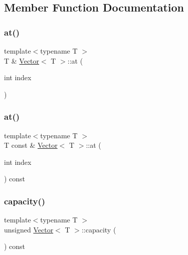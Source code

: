 \subsection{Member Function Documentation}
\mbox{\label{classVector_a0a53d8de64ae7cc1e388df4e46ab06bf}} 
\subsubsection{\texorpdfstring{at()}{at()}\hspace{0.1cm}{\footnotesize\ttfamily [1/2]}}
{\footnotesize\ttfamily template$<$typename T $>$ \\
T \& \hyperlink{classVector}{Vector}$<$ T $>$\+::at (\begin{DoxyParamCaption}\item[{int}]{index }\end{DoxyParamCaption})}

\mbox{\label{classVector_a2539a2d9ca64fd4e400d1bdc23dc292c}} 
\subsubsection{\texorpdfstring{at()}{at()}\hspace{0.1cm}{\footnotesize\ttfamily [2/2]}}
{\footnotesize\ttfamily template$<$typename T $>$ \\
T const  \& \hyperlink{classVector}{Vector}$<$ T $>$\+::at (\begin{DoxyParamCaption}\item[{int}]{index }\end{DoxyParamCaption}) const}

\mbox{\label{classVector_a30435b1635ae160705f53755d25a407b}} 
\subsubsection{\texorpdfstring{capacity()}{capacity()}}
{\footnotesize\ttfamily template$<$typename T $>$ \\
unsigned \hyperlink{classVector}{Vector}$<$ T $>$\+::capacity (\begin{DoxyParamCaption}{ }\end{DoxyParamCaption}) const}

